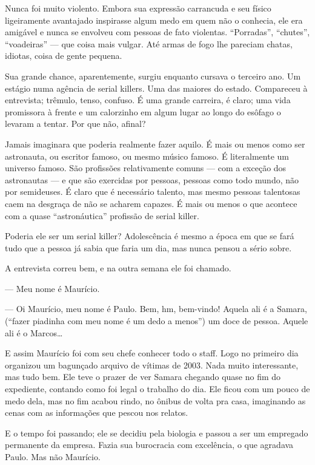 Nunca foi muito violento. Embora sua expressão carrancuda e seu físico ligeiramente avantajado inspirasse algum medo em quem não o conhecia, ele era amigável e nunca se envolveu com pessoas de fato violentas. ``Porradas'', ``chutes'', ``voadeiras'' --- que coisa mais vulgar. Até armas de fogo lhe pareciam chatas, idiotas, coisa de gente pequena.

Sua grande chance, aparentemente, surgiu enquanto cursava o terceiro ano. Um estágio numa agência de \foreignlanguage{english}{serial killers}. Uma das maiores do estado. Compareceu à entrevista; trêmulo, tenso, confuso. É uma grande carreira, é claro; uma vida promissora à frente e um calorzinho em algum lugar ao longo do esôfago o levaram a tentar. Por que não, afinal?

Jamais imaginara que poderia realmente fazer aquilo. É mais ou menos como ser astronauta, ou escritor famoso, ou mesmo músico famoso. É literalmente um universo famoso. São profissões relativamente comuns --- com a exceção dos astronautas --- e que são exercidas por pessoas, pessoas como todo mundo, não por semideuses. É claro que é necessário talento, mas mesmo pessoas talentosas caem na desgraça de não se acharem capazes. É mais ou menos o que acontece com a quase ``astronáutica'' profissão de \foreignlanguage{english}{serial killer}.

Poderia ele ser um \foreignlanguage{english}{serial killer}? Adolescência é mesmo a época em que se fará tudo que a pessoa já sabia que faria um dia, mas nunca pensou a sério sobre.

A entrevista correu bem, e na outra semana ele foi cha\-ma\-do.

--- Meu nome é Maurício.

--- Oi Maurício, meu nome é Paulo. Bem, hm, bem-vindo! Aquela ali é a Samara, (``fazer piadinha com meu nome é um dedo a menos'') um doce de pessoa. Aquele ali é o Marcos\ldots

E assim Maurício foi com seu chefe conhecer todo o staff. Logo no primeiro dia organizou um bagunçado arquivo de vítimas de 2003. Nada muito interessante, mas tudo bem. Ele teve o prazer de ver Samara chegando quase no fim do expediente, contando como foi legal o trabalho do dia. Ele ficou com um pouco de medo dela, mas no fim acabou rindo, no ônibus de volta pra casa, imaginando as cenas com as informações que pescou nos relatos.

E o tempo foi passando; ele se decidiu pela biologia e passou a ser um empregado permanente da empresa. Fazia sua burocracia com excelência, o que agradava Paulo. Mas não Maurício.

